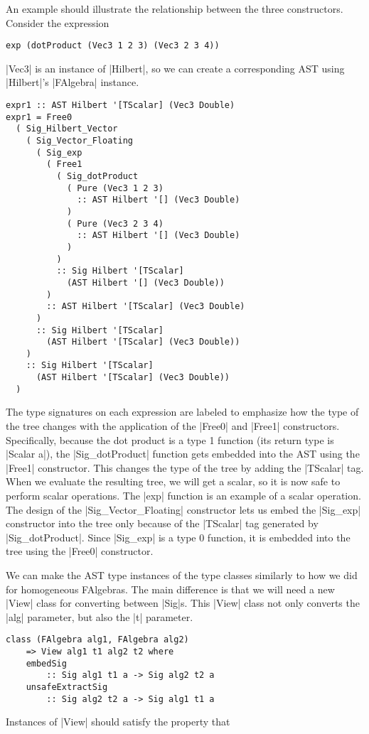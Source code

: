 \documentclass[preprint]{sigplanconf}
\theoremstyle{definition}
\begin{document}
An example should illustrate the relationship between the three constructors.
Consider the expression
\begin{lstlisting}
exp (dotProduct (Vec3 1 2 3) (Vec3 2 3 4))
\end{lstlisting}
|Vec3| is an instance of |Hilbert|, so we can create a corresponding AST using |Hilbert|'s |FAlgebra| instance.
\begin{lstlisting}
expr1 :: AST Hilbert '[TScalar] (Vec3 Double)
expr1 = Free0
  ( Sig_Hilbert_Vector
    ( Sig_Vector_Floating
      ( Sig_exp
        ( Free1
          ( Sig_dotProduct
            ( Pure (Vec3 1 2 3)
              :: AST Hilbert '[] (Vec3 Double)
            )
            ( Pure (Vec3 2 3 4)
              :: AST Hilbert '[] (Vec3 Double)
            )
          )
          :: Sig Hilbert '[TScalar]
            (AST Hilbert '[] (Vec3 Double))
        )
        :: AST Hilbert '[TScalar] (Vec3 Double)
      )
      :: Sig Hilbert '[TScalar]
        (AST Hilbert '[TScalar] (Vec3 Double))
    )
    :: Sig Hilbert '[TScalar]
      (AST Hilbert '[TScalar] (Vec3 Double))
  )
\end{lstlisting}
The type signatures on each expression are labeled to emphasize how the type of the tree changes with the application of the |Free0| and |Free1| constructors.
Specifically, because the dot product is a type 1 function (its return type is |Scalar a|),
the |Sig_dotProduct| function gets embedded into the AST using the |Free1| constructor.
This changes the type of the tree by adding the |TScalar| tag.
When we evaluate the resulting tree, we will get a scalar,
so it is now safe to perform scalar operations.
The |exp| function is an example of a scalar operation.
The design of the |Sig_Vector_Floating| constructor lets us embed the |Sig_exp| constructor into the tree only because of the |TScalar| tag generated by |Sig_dotProduct|.
Since |Sig_exp| is a type 0 function,
it is embedded into the tree using the |Free0| constructor.

We can make the AST type instances of the type classes similarly to how we did for homogeneous FAlgebras.
The main difference is that we will need a new |View| class for converting between |Sig|s.
This |View| class not only converts the |alg| parameter, but also the |t| parameter.
\begin{lstlisting}
class (FAlgebra alg1, FAlgebra alg2)
    => View alg1 t1 alg2 t2 where
    embedSig
        :: Sig alg1 t1 a -> Sig alg2 t2 a
    unsafeExtractSig
        :: Sig alg2 t2 a -> Sig alg1 t1 a
\end{lstlisting}
Instances of |View| should satisfy the property that
\end{document}
